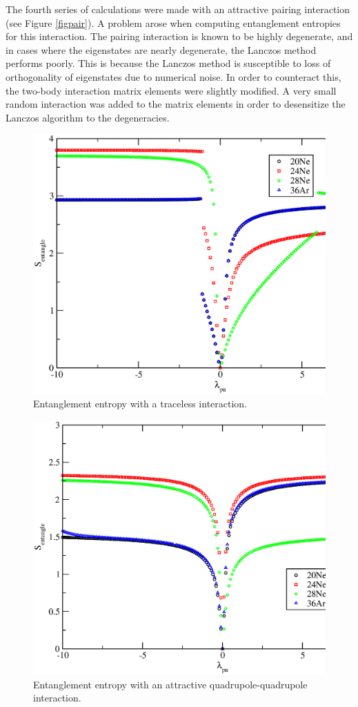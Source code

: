 The fourth series of calculations were made with an attractive pairing interaction (see Figure \ref{figpair}).
A problem arose when computing entanglement entropies for this interaction.
The pairing interaction is known to be highly degenerate, and in cases where the eigenstates are
nearly degenerate, the Lanczos method performs poorly. 
This is because the Lanczos method is susceptible to loss
of orthogonality of eigenstates due to numerical noise.
In order to counteract this, the two-body interaction
matrix elements were slightly modified. A very small random
interaction was added to the matrix elements in order to
desensitize the Lanczos algorithm to the degeneracies.
\begin{figure}[h]
    \centering

        \includegraphics[width=.75\textwidth,clip]{Figures/s_vs_lambda_nmp_ne}
        \caption{Entanglement entropy with a traceless interaction.}
        \label{fignmp}
\end{figure}
\begin{figure}
        \centering
        \includegraphics[width=.75\textwidth,clip]{Figures/s_vs_lambda_qq_ne}
        \caption{Entanglement entropy with an attractive quadrupole-quadrupole interaction.}
        \label{figqq}
\end{figure}

